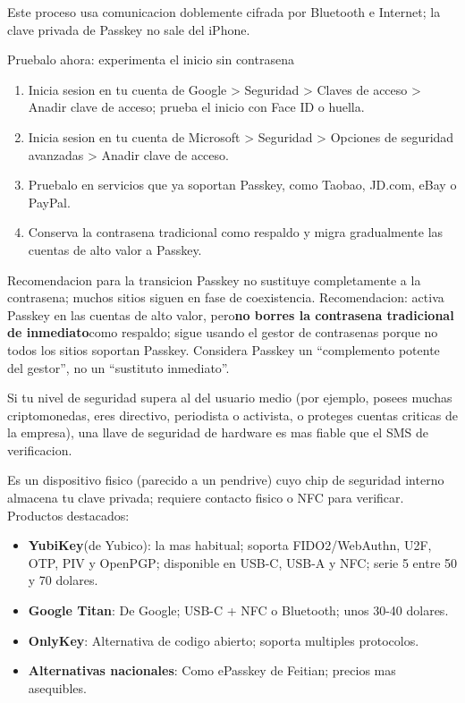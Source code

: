 Este proceso usa comunicacion doblemente cifrada por Bluetooth e Internet; la clave privada de Passkey no sale del iPhone.

\begin{tcbpractice}{Pruebalo ahora: experimenta el inicio sin contrasena}
\begin{enumerate}
  \item Inicia sesion en tu cuenta de Google > Seguridad > Claves de acceso > Anadir clave de acceso; prueba el inicio con Face ID o huella.
  \item Inicia sesion en tu cuenta de Microsoft > Seguridad > Opciones de seguridad avanzadas > Anadir clave de acceso.
  \item Pruebalo en servicios que ya soportan Passkey, como Taobao, JD.com, eBay o PayPal.
  \item Conserva la contrasena tradicional como respaldo y migra gradualmente las cuentas de alto valor a Passkey.
\end{enumerate}

\end{tcbpractice}

\begin{tcbwarn}{Recomendacion para la transicion}
Passkey no sustituye completamente a la contrasena; muchos sitios siguen en fase de coexistencia. Recomendacion: activa Passkey en las cuentas de alto valor, pero\textbf{no borres la contrasena tradicional de inmediato}como respaldo; sigue usando el gestor de contrasenas porque no todos los sitios soportan Passkey. Considera Passkey un “complemento potente del gestor”, no un “sustituto inmediato”.

\end{tcbwarn}


Si tu nivel de seguridad supera al del usuario medio (por ejemplo, posees muchas criptomonedas, eres directivo, periodista o activista, o proteges cuentas criticas de la empresa), una llave de seguridad de hardware es mas fiable que el SMS de verificacion.


Es un dispositivo fisico (parecido a un pendrive) cuyo chip de seguridad interno almacena tu clave privada; requiere contacto fisico o NFC para verificar. Productos destacados:

\begin{itemize}
  \item \textbf{YubiKey}(de Yubico): la mas habitual; soporta FIDO2/WebAuthn, U2F, OTP, PIV y OpenPGP; disponible en USB-C, USB-A y NFC; serie 5 entre 50 y 70 dolares.
  \item \textbf{Google Titan}: De Google; USB-C + NFC o Bluetooth; unos 30-40 dolares.
  \item \textbf{OnlyKey}: Alternativa de codigo abierto; soporta multiples protocolos.
  \item \textbf{Alternativas nacionales}: Como ePasskey de Feitian; precios mas asequibles.
\end{itemize}

